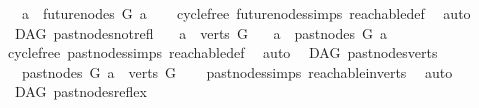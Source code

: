 \begin{isabellebody}
\ \ \ {\isachardoublequoteopen}a\ {\isasymnotin}\ future{\isacharunderscore}{\kern0pt}nodes\ G\ a{\isachardoublequoteclose}\isanewline
%
\isadelimproof
\ \ %
\endisadelimproof
%
\isatagproof
{}\isamarkupfalse%
\ cycle{\isacharunderscore}{\kern0pt}free\ future{\isacharunderscore}{\kern0pt}nodes{\isachardot}{\kern0pt}simps\ reachable{\isacharunderscore}{\kern0pt}def\ \isamarkupfalse%
\ auto%
\endisatagproof
{\isafoldproof}%
%
\isadelimproof
%
\endisadelimproof
%
\isadelimdocument
%
\endisadelimdocument
%
\isatagdocument
%
\isamarkuptrue%
%
\endisatagdocument
{\isafolddocument}%
%
\isadelimdocument
%
\endisadelimdocument
{}\isamarkupfalse%
\ {\isacharparenleft}{\kern0pt}\ DAG{\isacharparenright}{\kern0pt}\ past{\isacharunderscore}{\kern0pt}nodes{\isacharunderscore}{\kern0pt}not{\isacharunderscore}{\kern0pt}refl{\isacharcolon}{\kern0pt}\isanewline
\ \ \ {\isachardoublequoteopen}a\ {\isasymin}\ verts\ G{\isachardoublequoteclose}\isanewline
\ \ \ {\isachardoublequoteopen}a\ {\isasymnotin}\ past{\isacharunderscore}{\kern0pt}nodes\ G\ a{\isachardoublequoteclose}\isanewline
%
\isadelimproof
\ \ %
\endisadelimproof
%
\isatagproof
{}\isamarkupfalse%
\ cycle{\isacharunderscore}{\kern0pt}free\ past{\isacharunderscore}{\kern0pt}nodes{\isachardot}{\kern0pt}simps\ reachable{\isacharunderscore}{\kern0pt}def\ \isamarkupfalse%
\ auto%
\endisatagproof
{\isafoldproof}%
%
\isadelimproof
\isanewline
%
\endisadelimproof
\isanewline
{}\isamarkupfalse%
\ {\isacharparenleft}{\kern0pt}\ DAG{\isacharparenright}{\kern0pt}\ past{\isacharunderscore}{\kern0pt}nodes{\isacharunderscore}{\kern0pt}verts{\isacharcolon}{\kern0pt}\ \isanewline
\ \ \ {\isachardoublequoteopen}past{\isacharunderscore}{\kern0pt}nodes\ G\ a\ {\isasymsubseteq}\ verts\ G{\isachardoublequoteclose}\isanewline
%
\isadelimproof
\ \ %
\endisadelimproof
%
\isatagproof
{}\isamarkupfalse%
\ past{\isacharunderscore}{\kern0pt}nodes{\isachardot}{\kern0pt}simps\ reachable{}{\isacharunderscore}{\kern0pt}in{\isacharunderscore}{\kern0pt}verts\ \isamarkupfalse%
\ auto%
\endisatagproof
{\isafoldproof}%
%
\isadelimproof
\isanewline
%
\endisadelimproof
\isanewline
{}\isamarkupfalse%
\ {\isacharparenleft}{\kern0pt}\ DAG{\isacharparenright}{\kern0pt}\ past{\isacharunderscore}{\kern0pt}nodes{\isacharunderscore}{\kern0pt}refl{\isacharunderscore}{\kern0pt}ex{\isacharcolon}{\kern0pt}\isanewline

\end{isabellebody}
